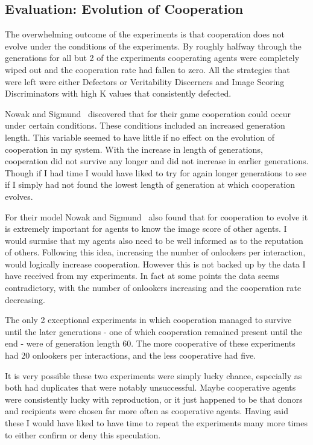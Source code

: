 \documentclass[]{final_report}
\begin{document}
\subsection{Evaluation: Evolution of Cooperation}
The overwhelming outcome of the experiments is that cooperation does not evolve under the conditions of the experiments. By roughly halfway through the generations for all but 2 of the experiments cooperating agents were completely wiped out and the cooperation rate had fallen to zero. All the strategies that were left were either Defectors or Veritability Discerners and Image Scoring Discriminators with high K values that consistently defected.\par 
Nowak and Sigmund~\cite{evol_indirect_image} discovered that for their game cooperation could occur under certain conditions. These conditions included an increased generation length. This variable seemed to have little if no effect on the evolution of cooperation in my system. With the increase in length of generations, cooperation did not survive any longer and did not increase in earlier generations. Though if I had time I would have liked to try for again longer generations to see if I simply had not found the lowest length of generation at which cooperation evolves.\par 
For their model Nowak and Sigmund~\cite{evol_indirect_image} also found that for cooperation to evolve it is extremely important for agents to know the image score of other agents. I would surmise that my agents also need to be well informed as to the reputation of others. Following this idea, increasing the number of onlookers per interaction, would logically increase cooperation. However this is not backed up by the data I have received from my experiments. In fact at some points the data seems contradictory, with the number of onlookers increasing and the cooperation rate decreasing.\par 
The only 2 exceptional experiments in which cooperation managed to survive until the later generations - one of which cooperation remained present until the end - were of generation length 60. The more cooperative of these experiments had 20 onlookers per interactions, and the less cooperative had five.\par 
It is very possible these two experiments were simply lucky chance, especially as both had duplicates that were notably unsuccessful. Maybe cooperative agents were consistently lucky with reproduction, or it just happened to be that donors and recipients were chosen far more often as cooperative agents. Having said these I would have liked to have time to repeat the experiments many more times to either confirm or deny this speculation.
\end{document}
